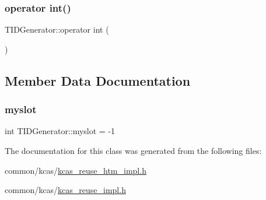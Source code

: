 \mbox{\label{classTIDGenerator_a355d43f0b8f7d1c6f04d57c9dba23124}} 
\subsubsection{\texorpdfstring{operator int()}{operator int()}\hspace{0.1cm}{\footnotesize\ttfamily [2/2]}}
{\footnotesize\ttfamily T\+I\+D\+Generator\+::operator int (\begin{DoxyParamCaption}{ }\end{DoxyParamCaption})\hspace{0.3cm}{\ttfamily [inline]}}



\subsection{Member Data Documentation}
\mbox{\label{classTIDGenerator_a48936068537b5d3251113c15929b4289}} 
\subsubsection{\texorpdfstring{myslot}{myslot}}
{\footnotesize\ttfamily int T\+I\+D\+Generator\+::myslot = -\/1}



The documentation for this class was generated from the following files\+:\begin{DoxyCompactItemize}
\item 
common/kcas/\hyperlink{kcas__reuse__htm__impl_8h}{kcas\+\_\+reuse\+\_\+htm\+\_\+impl.\+h}\item 
common/kcas/\hyperlink{kcas__reuse__impl_8h}{kcas\+\_\+reuse\+\_\+impl.\+h}\end{DoxyCompactItemize}
